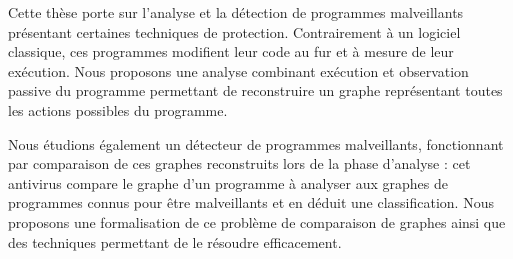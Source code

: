 Cette thèse porte sur l'analyse et la détection de programmes malveillants présentant certaines techniques de protection.
Contrairement à un logiciel classique, ces programmes modifient leur code au fur et à mesure de leur exécution.
Nous proposons une analyse combinant exécution et observation passive du programme permettant de reconstruire un graphe représentant toutes les actions possibles du programme.

Nous étudions également un détecteur de programmes malveillants, fonctionnant par comparaison de ces graphes reconstruits lors de la phase d'analyse : cet antivirus compare le graphe d'un programme à analyser aux graphes de programmes connus pour être malveillants et en déduit une classification.
Nous proposons une formalisation de ce problème de comparaison de graphes ainsi que des techniques permettant de le résoudre efficacement.
